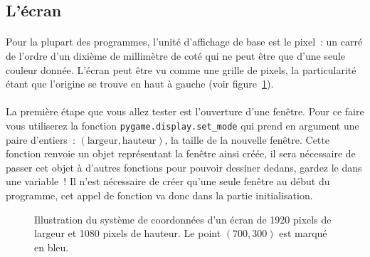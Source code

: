 \subsection{L'écran}
\label{sec:ecran}

\paragraph{}
Pour la plupart des programmes, l'unité d'affichage de base est le pixel~: un carré de l'ordre d'un dixième de millimètre de coté qui ne peut être que d'une seule couleur donnée.
L'écran peut être vu comme une grille de pixels, la particularité étant que l'origine se trouve en haut à gauche (voir figure~\ref{fig:ecran}).

\paragraph{}
La première étape que vous allez tester est l'ouverture d'une fenêtre.
Pour ce faire vous utiliserez la fonction \texttt{pygame.display.set\_mode} qui prend en argument une paire d'entiers~: \((\text{largeur}, \text{hauteur})\), la taille de la nouvelle fenêtre.
Cette fonction renvoie un objet représentant la fenêtre ainsi créée, il sera nécessaire de passer cet objet à d'autres fonctions pour pouvoir dessiner dedans, gardez le dans une variable~!
Il n'est nécessaire de créer qu'une seule fenêtre au début du programme, cet appel de fonction va donc dans la partie initialisation.

\begin{figure}[t]
	\caption{Illustration du système de coordonnées d'un écran de 1920 pixels de largeur et 1080 pixels de hauteur. Le point \((700, 300)\) est marqué en bleu.}
	\label{fig:ecran}
\end{figure}


